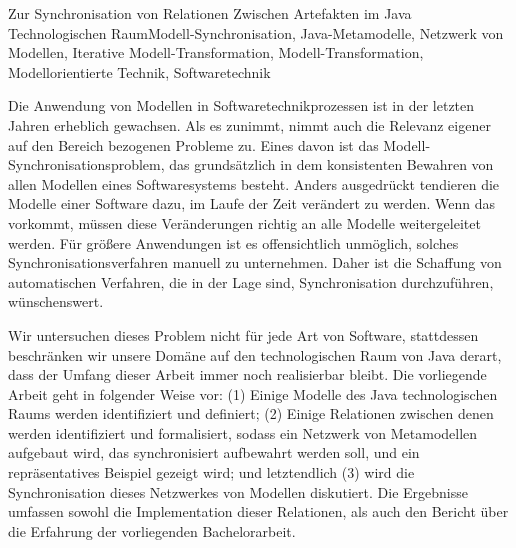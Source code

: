 \documentclass[tuberlin,cic,tc,english,noabntcite,oneside]{iiufrgs}
\begin{document}
\begin{englishabstract}{Zur Synchronisation von Relationen Zwischen Artefakten im Java Technologischen Raum}{Modell-Synchronisation, Java-Metamodelle, Netzwerk von Modellen, Iterative Modell-Transformation, Modell-Transformation, Modellorientierte Technik, Softwaretechnik}

Die Anwendung von Modellen in Softwaretechnikprozessen ist in der letzten Jahren erheblich gewachsen. Als es zunimmt, nimmt auch die Relevanz eigener auf den Bereich bezogenen Probleme zu. Eines davon ist das Modell-Synchronisationsproblem, das grundsätzlich in dem konsistenten Bewahren von allen Modellen eines Softwaresystems besteht. Anders ausgedrückt tendieren die Modelle einer Software dazu, im Laufe der Zeit verändert zu werden. Wenn das vorkommt, müssen diese Veränderungen richtig an alle Modelle weitergeleitet werden. Für größere Anwendungen ist es offensichtlich unmöglich, solches Synchronisationsverfahren manuell zu unternehmen. Daher ist die Schaffung von automatischen Verfahren, die in der Lage sind, Synchronisation durchzuführen, wünschenswert.

Wir untersuchen dieses Problem nicht für jede Art von Software, stattdessen beschränken wir unsere Domäne auf den technologischen Raum von Java derart, dass der Umfang dieser Arbeit immer noch realisierbar bleibt. Die vorliegende Arbeit geht in folgender Weise vor: (1) Einige Modelle des Java technologischen Raums werden identifiziert und definiert; (2) Einige Relationen zwischen denen werden identifiziert und formalisiert, sodass ein Netzwerk von Metamodellen aufgebaut wird, das synchronisiert aufbewahrt werden soll, und ein repräsentatives Beispiel gezeigt wird; und letztendlich (3) wird die Synchronisation dieses Netzwerkes von Modellen diskutiert. Die Ergebnisse umfassen sowohl die Implementation dieser Relationen, als auch den Bericht über die Erfahrung der vorliegenden Bachelorarbeit.

\end{englishabstract}

\listoffigures

\end{document}
